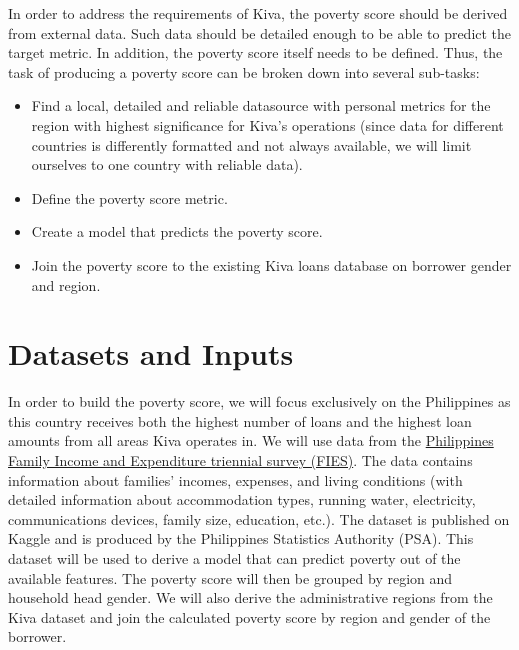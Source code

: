 \documentclass{article}
\begin{document}
In order to address the requirements of Kiva, the poverty score should be derived from external data. Such data should be detailed enough to be able to predict the target metric. In addition, the poverty score itself needs to be defined. Thus, the task of producing a poverty score can be broken down into several sub-tasks:
\begin{itemize}
  \item Find a local, detailed and reliable datasource with personal metrics for the region with highest significance for Kiva’s operations (since data for different countries is differently formatted and not always available, we will limit ourselves to one country with reliable data).
  \item Define the poverty score metric.
  \item Create a model that predicts the poverty score.
  \item Join the poverty score to the existing Kiva loans database on borrower gender and region.
\end{itemize}
\section{Datasets and Inputs}

In order to build the poverty score, we will focus exclusively on the Philippines as this country receives both the highest number of loans and the highest loan amounts from all areas Kiva operates in.
We will use data from the \href{https://www.kaggle.com/grosvenpaul/family-income-and-expenditure}{Philippines Family Income and Expenditure triennial survey (FIES)}. The data contains information about families’ incomes, expenses, and living conditions (with detailed information about accommodation types, running water, electricity, communications devices, family size, education, etc.). The dataset is published on Kaggle and is produced by the Philippines Statistics Authority (PSA).
This dataset will be used to derive a model that can predict poverty out of the available features. The poverty score will then be grouped by region and household head gender. We will also derive the administrative regions from the Kiva dataset and join the calculated poverty score by region and gender of the borrower.
\end{document}
